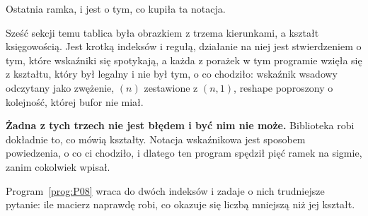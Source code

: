 \begin{fr}
Ostatnia ramka, i jest o tym, co kupiła ta notacja.

Sześć sekcji temu tablica była obrazkiem z trzema kierunkami, a kształt
księgowością. Jest krotką indeksów i regułą, działanie na niej jest
stwierdzeniem o tym, które wskaźniki się spotykają, a każda z porażek w tym
programie wzięła się z kształtu, który był legalny i nie był tym, o co
chodziło: wskaźnik wsadowy odczytany jako zwężenie, $(n)$ zestawione z
$(n, 1)$, reshape poproszony o kolejność, której bufor nie miał.

\textbf{Żadna z tych trzech nie jest błędem i być nim nie może.} Biblioteka
robi dokładnie to, co mówią kształty. Notacja wskaźnikowa jest sposobem
powiedzenia, o co ci chodziło, i dlatego ten program spędził pięć ramek na
sigmie, zanim cokolwiek wpisał.

Program~\ref{prog:P08} wraca do dwóch indeksów i zadaje o nich trudniejsze
pytanie: ile macierz naprawdę robi, co okazuje się liczbą mniejszą niż jej
kształt.
\end{fr}


